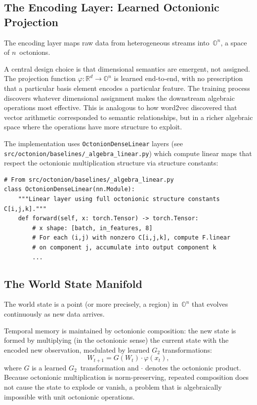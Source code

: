 \documentclass[11pt,a4paper]{article}
\newcommand{\Oct}{\mathbb{O}}
\newcommand{\Real}{\mathbb{R}}
\begin{document}
\subsection{The Encoding Layer: Learned Octonionic Projection}

The encoding layer maps raw data from heterogeneous streams into~$\Oct^n$, a space of $n$~octonions.

A central design choice is that dimensional semantics are emergent, not assigned. The projection function $\varphi\colon \Real^d \to \Oct^n$ is learned end-to-end, with no prescription that a particular basis element encodes a particular feature. The training process discovers whatever dimensional assignment makes the downstream algebraic operations most effective. This is analogous to how word2vec discovered that vector arithmetic corresponded to semantic relationships, but in a richer algebraic space where the operations have more structure to exploit.

The implementation uses \texttt{OctonionDenseLinear} layers (see \texttt{src/octonion/baselines/\_algebra\_linear.py}) which compute linear maps that respect the octonionic multiplication structure via structure constants:

\begin{lstlisting}[style=python, caption={Octonionic dense linear layer (simplified from codebase).}]
# From src/octonion/baselines/_algebra_linear.py
class OctonionDenseLinear(nn.Module):
    """Linear layer using full octonionic structure constants C[i,j,k]."""
    def forward(self, x: torch.Tensor) -> torch.Tensor:
        # x shape: [batch, in_features, 8]
        # For each (i,j) with nonzero C[i,j,k], compute F.linear
        # on component j, accumulate into output component k
        ...
\end{lstlisting}

\subsection{The World State Manifold}

The world state is a point (or more precisely, a region) in~$\Oct^n$ that evolves continuously as new data arrives.

Temporal memory is maintained by octonionic composition: the new state is formed by multiplying (in the octonionic sense) the current state with the encoded new observation, modulated by learned $G_2$ transformations:
\begin{equation}
W_{t+1} = G(W_t) \cdot \varphi(x_t),
\end{equation}
where $G$ is a learned $G_2$~transformation and $\cdot$ denotes the octonionic product. Because octonionic multiplication is norm-preserving, repeated composition does not cause the state to explode or vanish, a problem that is algebraically impossible with unit octonionic operations.
\end{document}
